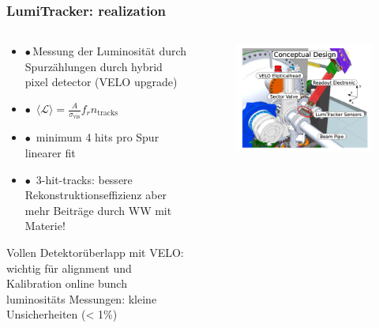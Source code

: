\documentclass[aspectratio=1610, 12pt, xcolor=dvipsnames]{beamer}
\begin{document}
\begin{frame}\frametitle{LumiTracker: realization}
  \begin{columns}
    \begin{column}[c]{0.48\textwidth}
      \begin{itemize}
        \item $\bullet$\,Messung der Luminosität durch Spurzählungen durch hybrid pixel detector (VELO upgrade)
        \item $\bullet$\, $\langle \mathcal{L} \rangle = \frac{A}{\sigma_{\text{vis}}} f_r n_{\text{tracks}}$
        \item $\bullet$\, minimum 4 hits pro Spur \to linearer fit
        \item $\bullet$\, 3-hit-tracks: bessere Rekonstruktionseffizienz aber mehr Beiträge durch WW mit Materie!
      \end{itemize}
\to Vollen Detektorüberlapp mit VELO: wichtig für alignment und Kalibration
\to online bunch luminositäts Messungen: kleine Unsicherheiten (< 1\%)
    \end{column}
    \begin{column}[c]{0.48\textwidth}
      \begin{figure}
	       \centering
	       \includegraphics[width=\textwidth]{plots/lumiTracker_design.png}
      \end{figure}
    \end{column}
  \end{columns}
\end{frame}
\end{document}
